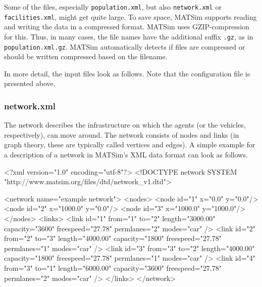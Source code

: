 Some of the files, especially \lstinline|population.xml|, but also \lstinline|network.xml| or \lstinline|facilities.xml|, might get quite large. To save space, MATSim supports reading and writing the data in a compressed format. MATSim uses GZIP-compression for this. Thus, in many cases, the file names have the additional suffix \lstinline|.gz|, as in \lstinline|population.xml.gz|. MATSim automatically detects if files are compressed or should be written compressed based on the filename. 

In more detail, the input files look as follows. Note that the configuration file is presented above.

\subsubsection{network.xml}
The network describes the infrastructure on which the agents (or the vehicles, respectively), can move around. The network consists of \glspl{node} and \glspl{link} (in graph theory, these are typically called vertices and edges). A simple example for a description of a network in MATSim's XML data format can look as follows.

\begin{xml}
<?xml version="1.0" encoding="utf-8"?> 
<!DOCTYPE network SYSTEM "http://www.matsim.org/files/dtd/network_v1.dtd"> 
 
<network name="example network"> 
   <nodes> 
      <node id="1" x="0.0" y="0.0"/> 
      <node id="2" x="1000.0" y="0.0"/> 
      <node id="3" x="1000.0" y="1000.0"/> 
   </nodes> 
   <links> 
      <link id="1" from="1" to="2" length="3000.00" capacity="3600" 
                                 freespeed="27.78" permlanes="2" modes="car" /> 
      <link id="2" from="2" to="3" length="4000.00" capacity="1800" 
                                 freespeed="27.78" permlanes="1" modes="car" /> 
      <link id="3" from="3" to="2" length="4000.00" capacity="1800" 
                                 freespeed="27.78" permlanes="1" modes="car" /> 
      <link id="4" from="3" to="1" length="6000.00" capacity="3600" 
                                 freespeed="27.78" permlanes="2" modes="car" /> 
   </links> 
</network>
\end{xml}

